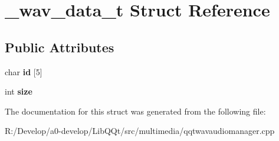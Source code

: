 \hypertarget{struct__wav__data__t}{}\section{\+\_\+wav\+\_\+data\+\_\+t Struct Reference}
\label{struct__wav__data__t}
\subsection*{Public Attributes}
\begin{DoxyCompactItemize}
\item 
\mbox{\label{struct__wav__data__t_a69ce5fe9148188023ecaf818c8e62a59}} 
char {\bfseries id} \mbox{[}5\mbox{]}
\item 
\mbox{\label{struct__wav__data__t_ac335aa8494a014632a29ac872c895827}} 
int {\bfseries size}
\end{DoxyCompactItemize}


The documentation for this struct was generated from the following file\+:\begin{DoxyCompactItemize}
\item 
R\+:/\+Develop/a0-\/develop/\+Lib\+Q\+Qt/src/multimedia/qqtwavaudiomanager.\+cpp\end{DoxyCompactItemize}
